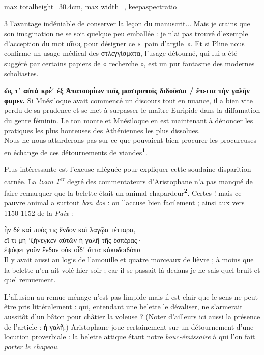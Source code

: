 \documentclass[11pt,twoside]{book}
\newcommand{\italique}[1]{\textit{#1}}
\newcommand{\citComm}[1]{\begin{quoting}[vskip=0.4pt,leftmargin=0.7em,rightmargin=0.2em]#1\end{quoting}}
\newcommand{\expo}[1]{\textsuperscript{#1}}
\newcommand{\marqueur}[1]{\textsuperscript{\color{rubricRed}\textbf{#1}}}
\begin{document}
\begin{adjustbox}{max totalheight=30.4cm, max width=\textwidth, keepaspectratio}
\begin{minipage}{\textwidth}
{\begin{multicols}{3}
l'avantage indéniable de conserver la leçon du manuscrit... Mais je crains que son imagination ne se soit quelque peu emballée : je n'ai pas trouvé d'exemple d'acception du mot σῖτος pour désigner ce «~pain d'argile~». Et si Pline nous confirme un usage médical des στλεγγίσματα, l'usage détourné, qui lui a été suggéré par certains papiers de « recherche », est un pur fantasme des modernes scholiastes.
\par\vspace{1.5pt}
 \textbf{ὥς τ᾽ αὐτὰ κρέ᾽ ἐξ Ἀπατουρίων ταῖς μαστροποῖς διδοῦσαι / ἔπειτα τὴν γαλῆν φαμεν.} Si Mnésiloque avait commencé un discours tout en nuance, il a bien vite perdu de sa prudence et se met à surpasser le maître Euripide dans la diffamation du genre féminin. Le ton monte et Mnésiloque en est maintenant à dénoncer les pratiques les plus honteuses des Athéniennes les plus dissolues.\\ Nous ne nous attarderons pas sur ce que pouvaient bien procurer les procureuses en échange de ces détournements de viandes\marqueur{1}.
\par\vspace{1.5pt}
\noindent Plus intéressante est l'excuse alléguée pour expliquer cette soudaine disparition carnée. La \italique{team 1\expo{er}} degré des commentateurs d'Aristophane n'a pas manqué de faire remarquer que la belette était un animal chapardeur\marqueur{2}. Certes ! mais ce pauvre animal a surtout \italique{bon dos} : on l'accuse bien facilement ; ainsi aux vers 1150-1152 de la \italique{Paix} :
\citComm{ἦν δὲ καὶ πυός τις ἔνδον καὶ λαγῷα τέτταρα,\\
εἴ τι μὴ 'ξήνεγκεν αὐτῶν ἡ γαλῆ τῆς ἑσπέρας·\\
ἐψόφει γοῦν ἔνδον οὐκ οἶδ᾽ ἅττα κἀκυδοιδόπα\\
Il y avait aussi au logis de l'amouille et quatre morceaux de lièvre ; 
à moins que la belette n'en ait volé hier soir ; 
car il se passait là-dedans je ne sais quel bruit et quel remuement.}
\par\vspace{1.5pt}
\noindent L'allusion au remue-ménage n'est pas limpide mais il est clair que le sens ne peut être pris littéralement : qui, entendant une belette le dévaliser, ne s'armerait aussitôt d'un bâton pour châtier la voleuse ? (Noter d'ailleurs ici aussi la présence de l'article : ἡ γαλῆ.)  Aristophane joue certainement sur un détournement d'une locution proverbiale : la belette attique étant notre \italique{bouc-émissaire} à qui l'on fait \italique{porter le chapeau}.

\end{multicols}}
\end{minipage}
\end{adjustbox}
\end{document}
